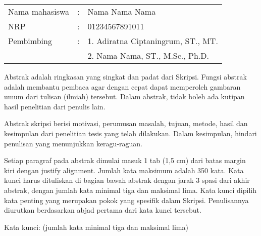 
\begin{tabular}{lcl}
Nama mahasiswa &:& Nama Nama Nama\\
NRP &:& 01234567891011\\
Pembimbing &:& 1. Adiratna Ciptaningrum, ST., MT.\\
& & 2. Nama Nama, ST., M.Sc., Ph.D.\\
\end{tabular}

\vspace{1ex}


Abstrak adalah ringkasan yang singkat dan padat dari Skripsi. Fungsi abstrak adalah membantu pembaca agar dengan cepat dapat memperoleh gambaran umum dari tulisan (ilmiah) tersebut. Dalam abstrak, tidak boleh ada kutipan hasil penelitian dari penulis lain.

Abstrak skripsi berisi motivasi, perumusan masalah, tujuan, metode, hasil dan kesimpulan dari penelitian tesis yang telah dilakukan. Dalam kesimpulan, hindari penulisan yang menunjukkan keragu-raguan.

Setiap paragraf pada abstrak dimulai masuk 1 tab (1,5 cm) dari batas margin kiri dengan justify alignment. Jumlah kata maksimum adalah 350 kata. Kata kunci harus dituliskan di bagian bawah abstrak dengan jarak 3 spasi dari akhir abstrak, dengan jumlah kata minimal tiga dan maksimal lima. Kata kunci dipilih kata penting yang merupakan pokok yang spesifik dalam Skripsi. Penulisannya diurutkan berdasarkan abjad pertama dari kata kunci tersebut.

\vspace{6ex}

\noindent Kata kunci: (jumlah kata minimal tiga dan maksimal lima)